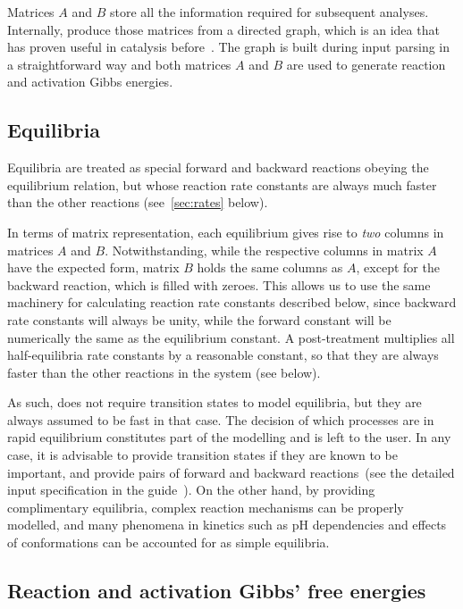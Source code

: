 Matrices $A$ and $B$ store all the information required for subsequent analyses.
Internally,
\overreact{} produce those matrices from a directed graph,
which is an idea that has proven useful in catalysis before~\cite{Kozuch_2006,Kozuch_2015,Solel_2019}.
The graph is built during input parsing in a straightforward way and both matrices $A$ and $B$ are used to generate reaction and activation Gibbs energies.

\subsection{Equilibria}%
\label{sec:kin-repr-equi}

Equilibria are treated as special forward and backward reactions obeying the equilibrium relation,
but whose reaction rate constants are always much faster than the other reactions (see~\cref{sec:rates} below).

In terms of matrix representation,
each equilibrium gives rise to \emph{two} columns in matrices $A$ and $B$.
Notwithstanding,
while the respective columns in matrix $A$ have the expected form,
matrix $B$ holds the same columns as $A$,
except for the backward reaction,
which is filled with zeroes.
This allows us to use the same machinery for calculating reaction rate constants described below,
since backward rate constants will always be unity,
while the forward constant will be numerically the same as the equilibrium constant.
A post-treatment multiplies all half-equilibria rate constants by a reasonable constant,
so that they are always faster than the other reactions in the system (see below).

As such,
\overreact{} does not require transition states to model equilibria,
but they are always assumed to be fast in that case.
The decision of which processes are in rapid equilibrium constitutes part of the modelling and is left to the user.
In any case,
it is advisable to provide transition states if they are known to be important,
and provide pairs of forward
and backward reactions~(see the detailed input specification in the guide~\cite{overreactguideinput2022}).
On the other hand,
by providing complimentary equilibria,
complex reaction mechanisms can be properly modelled,
and many phenomena in kinetics such as pH dependencies and effects of conformations can be accounted for as simple equilibria.

\subsection{Reaction and activation Gibbs' free energies}%
\label{sec:reaction-energies}

